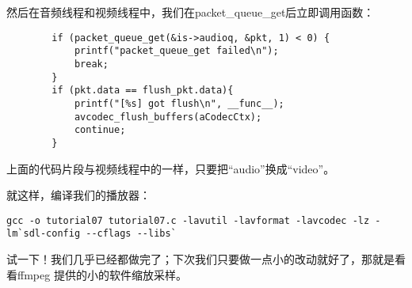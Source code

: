然后在音频线程和视频线程中，我们在packet_queue_get后立即调用函数：

\begin{lstlisting}
        if (packet_queue_get(&is->audioq, &pkt, 1) < 0) {
            printf("packet_queue_get failed\n");
            break;
        }
        if (pkt.data == flush_pkt.data){
            printf("[%s] got flush\n", __func__);
            avcodec_flush_buffers(aCodecCtx);
            continue;
        }
\end{lstlisting}

上面的代码片段与视频线程中的一样，只要把“audio”换成“video”。

就这样，编译我们的播放器：

\begin{lstlisting}
gcc -o tutorial07 tutorial07.c -lavutil -lavformat -lavcodec -lz -lm`sdl-config --cflags --libs`
\end{lstlisting}

试一下！我们几乎已经都做完了；下次我们只要做一点小的改动就好了，那就是看看ffmpeg 提供的小的软件缩放采样。

